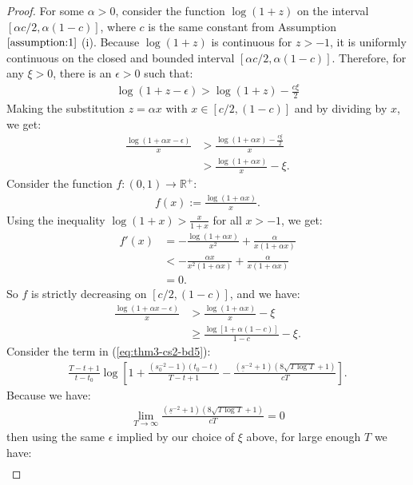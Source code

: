 \begin{proof}
For some $\alpha > 0$, consider the function $\log(1 + z)$ on the interval $[\alpha c/2, \alpha (1-c)]$, where $c$ is the same constant from Assumption $\ref{assumption:1}$ (i). Because $\log(1 + z)$ is continuous for $z > -1$, it is uniformly continuous on the closed and bounded interval $[\alpha c/2, \alpha (1-c)]$. Therefore, for any $\xi > 0$, there is an $\epsilon > 0$ such that:
\begin{align*}
     \log(1 + z - \epsilon) > \log(1 + z) - \frac{c \xi}{2}
\end{align*}
Making the substitution $z = \alpha x$ with $x \in [c/2, (1-c)]$ and by dividing by $x$, we get:
\begin{align*}
     \frac{\log(1 + \alpha x - \epsilon)}{x} &> \frac{\log(1 + \alpha x) - \frac{c \xi}{2}}{x} \\
     &> \frac{\log(1 + \alpha x)}{x} - \xi. \tag{$x \geq c/2$}
\end{align*}
Consider the function $f: (0,1) \to \mathbb{R}^+$:
\begin{align*}
    f(x) := \frac{\log(1 + \alpha x)}{x}.
\end{align*}
Using the inequality $\log(1+x) > \frac{x}{1+x}$ for all $x > - 1$, we get:
\begin{align*}
    f'(x) &= -\frac{\log(1 + \alpha x)}{x^2} + \frac{\alpha}{x(1 + \alpha x)} \\
    &< -\frac{\alpha x }{x^2(1+\alpha x)} + \frac{\alpha}{x(1 + \alpha x)} \\
    &= 0.
\end{align*}
So $f$ is strictly decreasing on $[c/2, (1-c)]$, and we have:
\begin{align*}
     \frac{\log(1 + \alpha x - \epsilon)}{x} &> \frac{\log(1 + \alpha x)}{x} - \xi \\
     &\geq \frac{\log[1 + \alpha (1-c)]}{1-c} - \xi.
\end{align*}
Consider the term in (\ref{eq:thm3-cs2-bd5}): 
\begin{align*}
     \frac{T-t+1}{t-t_0}\log\left[1 + \frac{\left(s_0^{-2} -1\right)(t_0 - t)}{T - t + 1} -  \frac{(\underline{s}^{-2} + 1)\left(8\sqrt{T\log T} +1\right)}{cT}\right].
\end{align*}
Because we have:
\begin{align*}
    \lim_{T \to \infty}  \frac{(\underline{s}^{-2} + 1)\left(8\sqrt{T\log T} +1\right)}{cT} = 0
\end{align*}
then using the same $\epsilon$ implied by our choice of $\xi$ above, for large enough $T$ we have:
\begin{align*}

\end{align*}
\end{proof}
